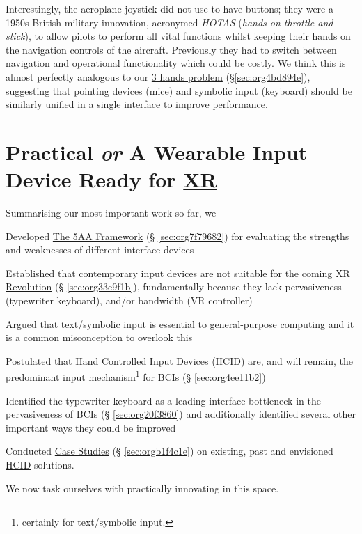 \documentclass[logo,bsc,singlespacing,parskip]{infthesis}
\begin{document}
Interestingly, the aeroplane joystick did not use to have buttons; they were a 1950s British military innovation, acronymed \emph{HOTAS} (\emph{hands on throttle-and-stick}), to allow pilots to perform all vital functions whilst keeping their hands on the navigation controls of the aircraft.
Previously they had to switch between navigation and operational functionality which could be costly.
We think this is almost perfectly analogous to our \hyperref[sec:org4bd894e]{3 hands problem} (\S \ref{sec:org4bd894e}), suggesting that pointing devices (mice) and symbolic input (keyboard) should be similarly unified in a single interface to improve performance.

\part{Practical \emph{or} A Wearable Input Device Ready for \hyperref[org39cbd51]{XR}}
\label{sec:org5f92648}
Summarising our most important work so far, we
\begin{enumerate*}[label={\arabic*)}, itemjoin={, \,}, itemjoin*={, and \,}]
\item Developed \hyperref[sec:org7f79682]{The 5AA Framework} (§ \ref{sec:org7f79682}) for evaluating the strengths and weaknesses of different interface devices
\item Established that contemporary input devices are not suitable for the coming \hyperref[sec:org33e9f1b]{XR Revolution} (§ \ref{sec:org33e9f1b}), fundamentally because they lack pervasiveness (typewriter keyboard), and/or bandwidth (VR controller)
\item Argued that text/symbolic input is essential to \hyperref[orgbaec896]{general-purpose computing} and it is a common misconception to overlook this
\item Postulated that Hand Controlled Input Devices (\hyperref[org0c83164]{HCID}) are, and will remain, the predominant input mechanism\footnote{certainly for text/symbolic input.} for BCIs (§ \ref{sec:org4ee11b2})
\item Identified the typewriter keyboard as a leading interface bottleneck in the pervasiveness of BCIs (§ \ref{sec:org20f3860}) and additionally identified several other important ways they could be improved
\item Conducted \hyperref[sec:orgb1f4c1e]{Case Studies} (§ \ref{sec:orgb1f4c1e}) on existing, past and envisioned \hyperref[org0c83164]{HCID} solutions.
\end{enumerate*}
We now task ourselves with practically innovating in this space. \medskip
\end{document}
